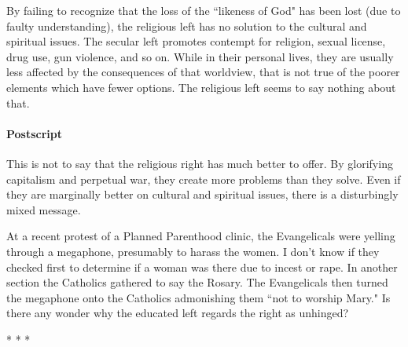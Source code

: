 By failing to recognize that the loss of the ``likeness of God" has been lost (due to faulty understanding), the religious left has no solution to the cultural and spiritual issues. The secular left promotes contempt for religion, sexual license, drug use, gun violence, and so on. While in their personal lives, they are usually less affected by the consequences of that worldview, that is not true of the poorer elements which have fewer options. The religious left seems to say nothing about that.

\paragraph{Postscript}
This is not to say that the religious right has much better to offer. By glorifying capitalism and perpetual war, they create more problems than they solve. Even if they are marginally better on cultural and spiritual issues, there is a disturbingly mixed message.

At a recent protest of a Planned Parenthood clinic, the Evangelicals were yelling through a megaphone, presumably to harass the women. I don't know if they checked first to determine if a woman was there due to incest or rape. In another section the Catholics gathered to say the Rosary. The Evangelicals then turned the megaphone onto the Catholics admonishing them ``not to worship Mary." Is there any wonder why the educated left regards the right as unhinged?




\begin{center}* * *\end{center}

